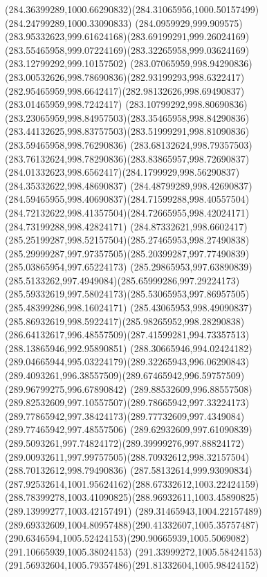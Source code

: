 {    \curveto(284.36399289,1000.66290832)(284.31065956,1000.50157499)(284.24799289,1000.33090833)
    \curveto(284.0959929,999.909575)(283.95332623,999.61624168)(283.69199291,999.26024169)
    \curveto(283.55465958,999.07224169)(283.32265958,999.03624169)(283.12799292,999.10157502)
    \curveto(283.07065959,998.94290836)(283.00532626,998.78690836)(282.93199293,998.6322417)
    \curveto(282.95465959,998.6642417)(282.98132626,998.69490837)(283.01465959,998.7242417)
    \curveto(283.10799292,998.80690836)(283.23065959,998.84957503)(283.35465958,998.84290836)
    \curveto(283.44132625,998.83757503)(283.51999291,998.81090836)(283.59465958,998.76290836)
    \curveto(283.68132624,998.79357503)(283.76132624,998.78290836)(283.83865957,998.72690837)
    \curveto(284.01332623,998.6562417)(284.1799929,998.56290837)(284.35332622,998.48690837)
    \curveto(284.48799289,998.42690837)(284.59465955,998.40690837)(284.71599288,998.40557504)
    \curveto(284.72132622,998.41357504)(284.72665955,998.42024171)(284.73199288,998.42824171)
    \curveto(284.87332621,998.6602417)(285.25199287,998.52157504)(285.27465953,998.27490838)
    \curveto(285.29999287,997.97357505)(285.20399287,997.77490839)(285.03865954,997.65224173)
    \curveto(285.29865953,997.63890839)(285.5133262,997.4949084)(285.65999286,997.29224173)
    \curveto(285.59332619,997.58024173)(285.53065953,997.86957505)(285.48399286,998.16024171)
    \curveto(285.43065953,998.49090837)(285.86932619,998.5922417)(285.98265952,998.28290838)
    \curveto(286.64132617,996.48557509)(287.41599281,994.73357513)(288.13865946,992.95890851)
    \curveto(288.30665946,994.02424182)(289.04665944,995.03224179)(289.32265943,996.06290843)
    \curveto(289.4093261,996.38557509)(289.67465942,996.59757509)(289.96799275,996.67890842)
    \curveto(289.88532609,996.88557508)(289.82532609,997.10557507)(289.78665942,997.33224173)
    \curveto(289.77865942,997.38424173)(289.77732609,997.4349084)(289.77465942,997.48557506)
    \curveto(289.62932609,997.61090839)(289.5093261,997.74824172)(289.39999276,997.88824172)
    \curveto(289.00932611,997.99757505)(288.70932612,998.32157504)(288.70132612,998.79490836)
    \curveto(287.58132614,999.93090834)(287.92532614,1001.95624162)(288.67332612,1003.22424159)
    \curveto(288.78399278,1003.41090825)(288.96932611,1003.45890825)(289.13999277,1003.42157491)
    \curveto(289.31465943,1004.22157489)(289.69332609,1004.80957488)(290.41332607,1005.35757487)
    \curveto(290.6346594,1005.52424153)(290.90665939,1005.5069082)(291.10665939,1005.38024153)
    \curveto(291.33999272,1005.58424153)(291.56932604,1005.79357486)(291.81332604,1005.98424152)
}
